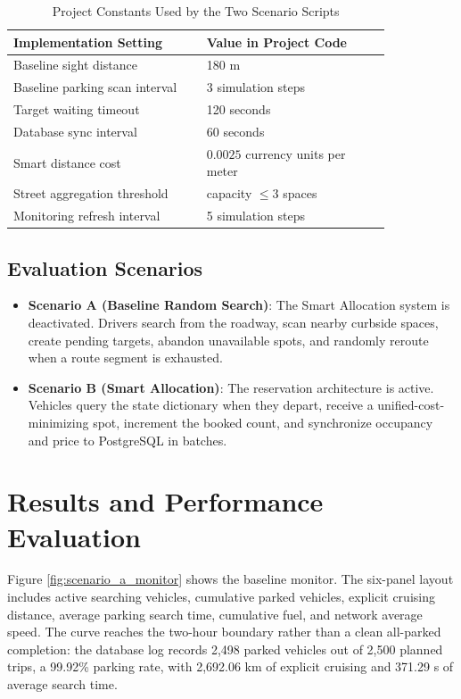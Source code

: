 \documentclass[conference]{IEEEtran}
\begin{document}
\begin{table}[htbp]
    \caption{Project Constants Used by the Two Scenario Scripts}
    \label{tab:implementation_constants}
    \centering
    \footnotesize
    \begin{tabular}{|p{0.43\linewidth}|p{0.41\linewidth}|}
        \hline
        \textbf{Implementation Setting} & \textbf{Value in Project Code} \\
        \hline
        Baseline sight distance & 180 m \\
        Baseline parking scan interval & 3 simulation steps \\
        Target waiting timeout & 120 seconds \\
        Database sync interval & 60 seconds \\
        Smart distance cost & $0.0025$ currency units per meter \\
        Street aggregation threshold & capacity $\leq 3$ spaces \\
        Monitoring refresh interval & 5 simulation steps \\
        \hline
    \end{tabular}
\end{table}

\subsection{Evaluation Scenarios}
\begin{itemize}
    \item \textbf{Scenario A (Baseline Random Search)}: The Smart Allocation system is deactivated. Drivers search from the roadway, scan nearby curbside spaces, create pending targets, abandon unavailable spots, and randomly reroute when a route segment is exhausted.
    \item \textbf{Scenario B (Smart Allocation)}: The reservation architecture is active. Vehicles query the state dictionary when they depart, receive a unified-cost-minimizing spot, increment the booked count, and synchronize occupancy and price to PostgreSQL in batches.
\end{itemize}

\section{Results and Performance Evaluation}

Figure \ref{fig:scenario_a_monitor} shows the baseline monitor. The six-panel layout includes active searching vehicles, cumulative parked vehicles, explicit cruising distance, average parking search time, cumulative fuel, and network average speed. The curve reaches the two-hour boundary rather than a clean all-parked completion: the database log records 2,498 parked vehicles out of 2,500 planned trips, a 99.92\% parking rate, with 2,692.06 km of explicit cruising and 371.29 s of average search time.
\end{document}
